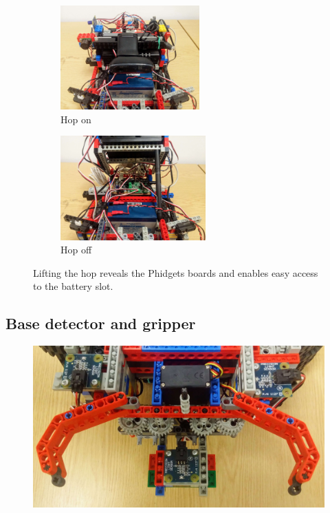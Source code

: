 \begin{figure}[ht]
    \centering
    \begin{subfigure}{0.45\textwidth}
        \includegraphics[width=\linewidth, height=4cm]{res/robot-pics/top-on.jpg} 
        \caption{Hop on}
        \label{fig:hop-on}
    \end{subfigure}
    \begin{subfigure}{0.45\textwidth}
        \includegraphics[width=\linewidth, height=4cm]{res/robot-pics/top-off.jpg}
        \caption{Hop off}
        \label{fig:hop-off}
    \end{subfigure}
    \caption{Lifting the hop reveals the Phidgets boards and enables easy access to the battery slot.}
    \label{fig:hop-on-off}
\end{figure}


\subsection{Base detector and gripper}

\begin{figure}[ht]
    \centering
    \includegraphics[width=0.7\linewidth]{res/robot-pics/base-detector-and-gripper.jpg}
    \caption{}
    \label{fig:}
\end{figure}

